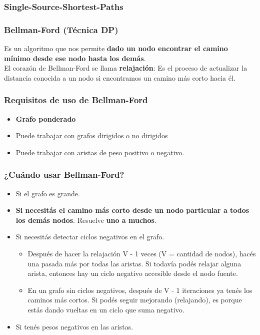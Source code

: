 \documentclass[10pt,a4paper]{article}
\begin{document}
\subsubsection*{Single-Source-Shortest-Paths}
\subsubsection*{Bellman-Ford (Técnica DP)}
Es un algoritmo que nos permite \textbf{dado un nodo encontrar el camino mínimo desde ese nodo hasta los demás}. \\
El corazón de Bellman-Ford se llama \textbf{relajación}: Es el proceso de actualizar la distancia conocida a un nodo si encontramos un camino más corto hacia él. 
\subsubsection*{Requisitos de uso de Bellman-Ford}
\begin{itemize}
    \item \textbf{Grafo ponderado}
    \item Puede trabajar con grafos dirigidos o no dirigidos 
    \item Puede trabajar con aristas de peso positivo o negativo.
\end{itemize}
\subsubsection*{¿Cuándo usar Bellman-Ford?}
\begin{itemize}
    \item Si el grafo es grande. 
    \item \textbf{Si necesitás el camino más corto desde un nodo particular a todos los demás nodos}. Resuelve \textbf{uno a muchos}.
    \item Si necesitás detectar ciclos negativos en el grafo.
    \begin{itemize}
        \item Después de hacer la relajación V - 1 veces (V = cantidad de nodos), hacés una pasada más por todas las aristas. Si todavía podés relajar alguna arista, entonces hay un ciclo negativo accesible desde el nodo fuente.
        \item En un grafo sin ciclos negativos, después de V - 1 iteraciones ya tenés los caminos más cortos. Si podés seguir mejorando (relajando), es porque estás dando vueltas en un ciclo que suma negativo.
    \end{itemize}
    \item Si tenés pesos negativos en las aristas.
\end{itemize}
\end{document}
